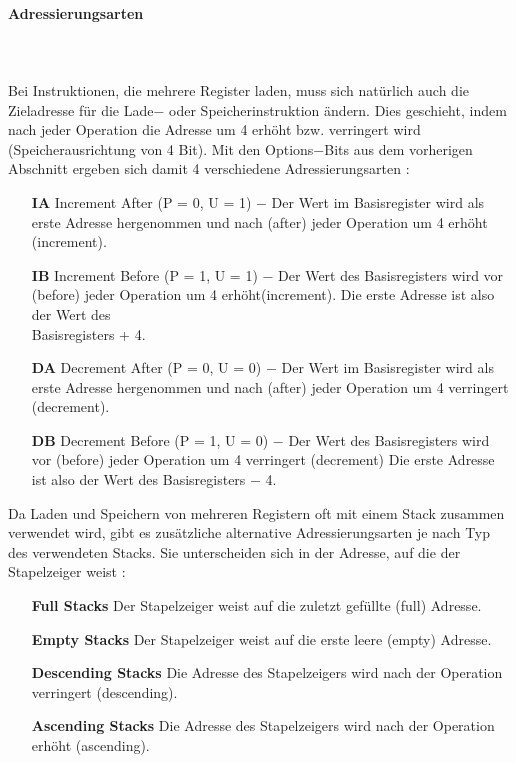 \documentclass[a4paper, 11pt, onecolumn]{article}
\begin{document}
\paragraph{Adressierungsarten}\label{sec:ldmstmaddr}
~\\ \\
Bei Instruktionen, die mehrere Register laden, muss sich natürlich auch die Zieladresse für die Lade$-$ oder Speicherinstruktion ändern. Dies geschieht, indem nach jeder Operation die Adresse um 4 erhöht bzw. verringert wird (Speicherausrichtung von 4 Bit). Mit den Options$-$Bits aus dem vorherigen Abschnitt ergeben sich damit 4 verschiedene Adressierungsarten \cite{arm:2005}:


\begin{itemize}[labelwidth=2em,leftmargin =\dimexpr{}+\relax, align=parleft]
\item[\textbf{IA}] Increment After (P = 0, U = 1) $-$ Der Wert im Basisregister wird als erste Adresse hergenommen und nach (after) jeder Operation um 4 erhöht (increment).
\item[\textbf{IB}] Increment Before (P = 1, U = 1) $-$ Der Wert des Basisregisters wird vor (before) jeder Operation um 4 erhöht(increment). Die erste Adresse ist also der Wert des\\Basisregisters + 4.
\item[\textbf{DA}] Decrement After (P = 0, U = 0) $-$ Der Wert im Basisregister wird als erste Adresse hergenommen und nach (after) jeder Operation um 4 verringert (decrement).
\item[\textbf{DB}] Decrement Before (P = 1, U = 0) $-$ Der Wert des Basisregisters wird vor (before) jeder Operation um 4 verringert (decrement) Die erste Adresse ist also der Wert des Basisregisters $-$ 4.
\end{itemize}

Da Laden und Speichern von mehreren Registern oft mit einem Stack zusammen verwendet wird, gibt es zusätzliche alternative Adressierungsarten je nach Typ des verwendeten Stacks. Sie unterscheiden sich in der Adresse, auf die der Stapelzeiger weist \cite{arm:2005}:


\begin{itemize}[labelwidth=10em,leftmargin =\dimexpr{}+\relax, align=parleft]
\item[\textbf{Full Stacks}] Der Stapelzeiger weist auf die zuletzt gefüllte (full) Adresse.
\item[\textbf{Empty Stacks}] Der Stapelzeiger weist auf die erste leere (empty) Adresse.
\item[\textbf{Descending Stacks}] Die Adresse des Stapelzeigers wird nach der Operation verringert (descending).
\item[\textbf{Ascending Stacks}] Die Adresse des Stapelzeigers wird nach der Operation erhöht (ascending).
\end{itemize}
\end{document}
